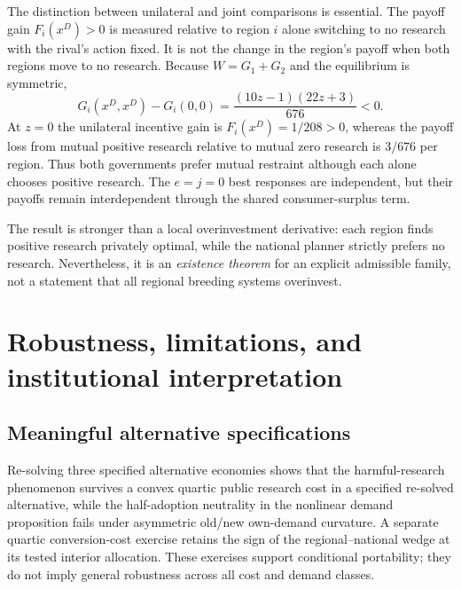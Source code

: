 \documentclass[11pt,a4paper]{article}
\begin{document}
The distinction between unilateral and joint comparisons is essential. The payoff gain $F_i(x^D)>0$ is measured relative to region $i$ alone switching to no research with the rival's action fixed. It is not the change in the region's payoff when both regions move to no research. Because $W=G_1+G_2$ and the equilibrium is symmetric,
\begin{equation}
G_i(x^D,x^D)-G_i(0,0)=\frac{(10z-1)(22z+3)}{676}<0.
\label{eq:mutuallocal}
\end{equation}
At $z=0$ the unilateral incentive gain is $F_i(x^D)=1/208>0$, whereas the payoff loss from mutual positive research relative to mutual zero research is $3/676$ per region. Thus both governments prefer mutual restraint although each alone chooses positive research. The $e=j=0$ best responses are independent, but their payoffs remain interdependent through the shared consumer-surplus term.

The result is stronger than a local overinvestment derivative: each region finds positive research privately optimal, while the national planner strictly prefers no research. Nevertheless, it is an \emph{existence theorem} for an explicit admissible family, not a statement that all regional breeding systems overinvest.

\section{Robustness, limitations, and institutional interpretation}
\subsection{Meaningful alternative specifications}
Re-solving three specified alternative economies shows that the harmful-research phenomenon survives a convex quartic public research cost in a specified re-solved alternative, while the half-adoption neutrality in the nonlinear demand proposition fails under asymmetric old/new own-demand curvature. A separate quartic conversion-cost exercise retains the sign of the regional--national wedge at its tested interior allocation. These exercises support conditional portability; they do not imply general robustness across all cost and demand classes.
\end{document}

